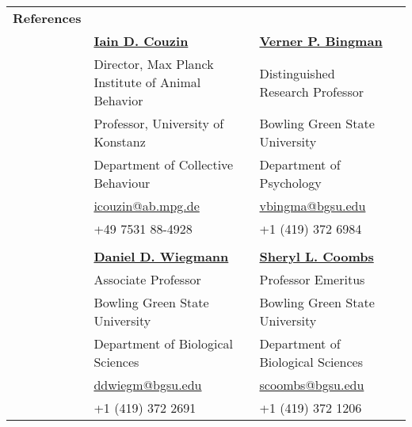 \documentclass[letterpaper,6pt,oneside]{article}
\begin{document}

\noindent \begin{longtable}{@{} l p{3.5in}l p{3.5in}|}
 \Large{\textbf{References}} \vspace{5mm} \\
 & \href{http://www.collectivebehaviour.com/couzin}{\textbf{Iain D. Couzin}} & \href{https://www.bgsu.edu/arts-and-sciences/biological-sciences/faculty-and-staff/alphabetical-listing/verner-bingman.html}{\textbf{Verner P. Bingman}} \\
 & Director, Max Planck Institute of Animal Behavior &  Distinguished Research Professor  \\
 & Professor, University of Konstanz &  Bowling Green State University \\
 & Department of Collective Behaviour  & Department of Psychology \\
 & \small{\href{mailto:icouzin@ab.mpg.de}{icouzin@ab.mpg.de}} & \small{\href{mailto:vbingma@bgsu.edu}{vbingma@bgsu.edu}} \\
 &\small{+49 7531 88-4928} & \small{+1 (419) 372 6984} \\
&& \\
  & \href{https://www.bgsu.edu/arts-and-sciences/biological-sciences/faculty-and-staff/alphabetical-listing/daniel-wiegmann.html}{\textbf{Daniel D. Wiegmann}} & \href{https://www.bgsu.edu/arts-and-sciences/neuroscience/nmb-people/faculty/sheryl-coombs.html}{\textbf{Sheryl L. Coombs}} \\
 & Associate Professor  &  Professor Emeritus \\
 & Bowling Green State University & Bowling Green State University \\
 & Department of Biological Sciences  & Department of Biological Sciences \\
 & \small{\href{mailto:ddwiegm@bgsu.edu}{ddwiegm@bgsu.edu}} & \small{\href{mailto:scoombs@bgsu.edu}{scoombs@bgsu.edu}} \\
 &\small{+1 (419) 372 2691} & \small{+1 (419) 372 1206} \\
 
\end{longtable}

%
\end{document}
